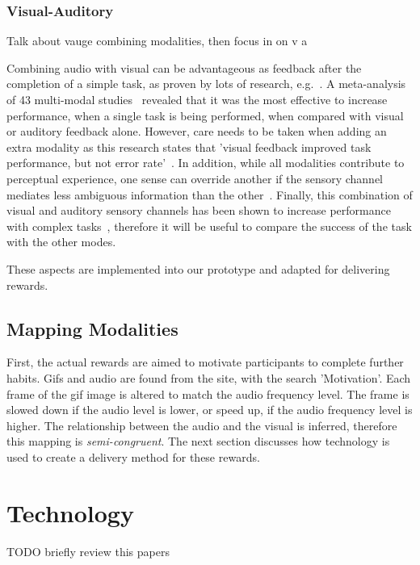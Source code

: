 \documentclass{scaffold/sigchi}
\begin{document}
\subsubsection{Visual-Auditory}
Talk about vauge combining modalities, then focus in on v a

Combining audio with visual can be advantageous as feedback after the completion of a simple task, as proven by lots of research, e.g.~\cite{benefits_of_audio_visual_1, benefits_of_audio_visual_2}. A meta-analysis of 43 multi-modal studies~\cite{comparing_modalities_effects_of_visual_auditory} revealed that it was the most effective to increase performance, when a single task is being performed, when compared with visual or auditory feedback alone. However, care needs to be taken when adding an extra modality as this research states that 'visual feedback improved task performance, but not error rate'~\cite{comparing_modalities_effects_of_visual_auditory}. In addition, while all modalities contribute to perceptual experience, one sense can override another if the sensory channel mediates less ambiguous information than the other~\cite{one_mode_override_another}. Finally, this combination of visual and auditory sensory channels has been shown to increase performance with complex tasks~\cite{chi_oussama_tap_the_shapetones}, therefore it will be useful to compare the success of the task with the other modes.

These aspects are implemented into our prototype and adapted for delivering rewards.

\subsection{Mapping Modalities}
First, the actual rewards are aimed to motivate participants to complete further habits. Gifs and audio are found from the site, with the search 'Motivation'. Each frame of the gif image is altered to match the audio frequency level. The frame is slowed down if the audio level is lower, or speed up, if the audio frequency level is higher. The relationship between the audio and the visual is inferred, therefore this mapping is \textit{semi-congruent}. The next section discusses how technology is used to create a delivery method for these rewards.

\section{Technology}
TODO briefly review this papers\cite{chi_crowd_designed_motivation}
\end{document}
